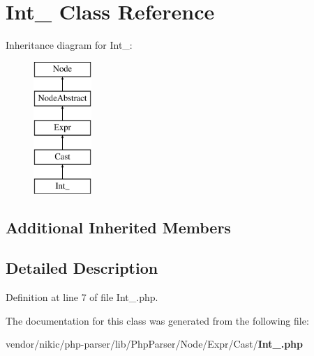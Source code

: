 \section{Int\+\_\+ Class Reference}
\label{class_php_parser_1_1_node_1_1_expr_1_1_cast_1_1_int__}
Inheritance diagram for Int\+\_\+\+:\begin{figure}[H]
\begin{center}
\leavevmode
\includegraphics[height=5.000000cm]{class_php_parser_1_1_node_1_1_expr_1_1_cast_1_1_int__}
\end{center}
\end{figure}
\subsection*{Additional Inherited Members}


\subsection{Detailed Description}


Definition at line 7 of file Int\+\_\+.\+php.



The documentation for this class was generated from the following file\+:\begin{DoxyCompactItemize}
\item 
vendor/nikic/php-\/parser/lib/\+Php\+Parser/\+Node/\+Expr/\+Cast/{\bf Int\+\_\+.\+php}\end{DoxyCompactItemize}
